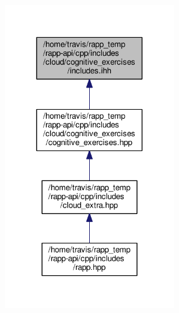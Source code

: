 \begin{figure}[H]
\begin{center}
\leavevmode
\includegraphics[width=212pt]{cloud_2cognitive__exercises_2includes_8ihh__dep__incl}
\end{center}
\end{figure}
